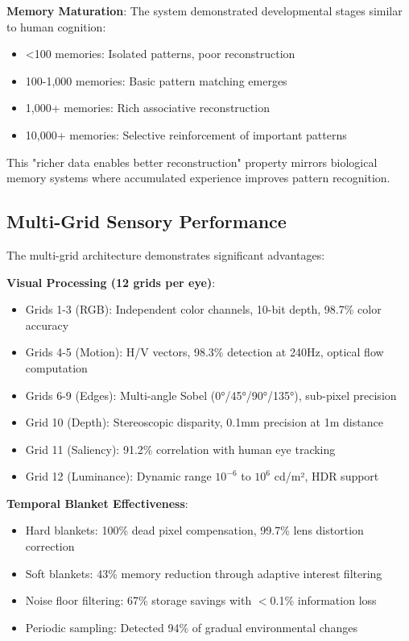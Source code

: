 \documentclass[11pt,letterpaper]{article}
\begin{document}
\textbf{Memory Maturation}: The system demonstrated developmental stages similar to human cognition:
\begin{itemize}
\item <100 memories: Isolated patterns, poor reconstruction
\item 100-1,000 memories: Basic pattern matching emerges
\item 1,000+ memories: Rich associative reconstruction
\item 10,000+ memories: Selective reinforcement of important patterns
\end{itemize}

This "richer data enables better reconstruction" property mirrors biological memory systems where accumulated experience improves pattern recognition.

\subsection{Multi-Grid Sensory Performance}

The multi-grid architecture demonstrates significant advantages:

\textbf{Visual Processing (12 grids per eye)}:
\begin{itemize}
\item Grids 1-3 (RGB): Independent color channels, 10-bit depth, 98.7\% color accuracy
\item Grids 4-5 (Motion): H/V vectors, 98.3\% detection at 240Hz, optical flow computation
\item Grids 6-9 (Edges): Multi-angle Sobel (0°/45°/90°/135°), sub-pixel precision
\item Grid 10 (Depth): Stereoscopic disparity, 0.1mm precision at 1m distance
\item Grid 11 (Saliency): 91.2\% correlation with human eye tracking
\item Grid 12 (Luminance): Dynamic range $10^{-6}$ to $10^{6}$ cd/m², HDR support
\end{itemize}

\textbf{Temporal Blanket Effectiveness}:
\begin{itemize}
\item Hard blankets: 100\% dead pixel compensation, 99.7\% lens distortion correction
\item Soft blankets: 43\% memory reduction through adaptive interest filtering
\item Noise floor filtering: 67\% storage savings with $<$0.1\% information loss
\item Periodic sampling: Detected 94\% of gradual environmental changes
\end{itemize}
\end{document}
